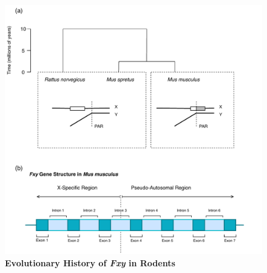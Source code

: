 \begin{figure}[!ht]
\centering
\includegraphics[width=\textwidth]{figures/diagrams/Fxy.pdf}
\caption{\textbf{Evolutionary History of \textit{Fxy} in Rodents} }
\label{fig:Fxy}
\end{figure}